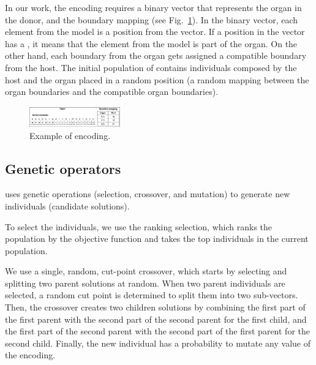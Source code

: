 In our work, the encoding requires a binary vector that represents the organ in the donor, and the boundary mapping (see Fig.~\ref{fig:encoding}). In the binary vector, each element from the model is a position from the vector. If a position in the vector has a , it means that the element from the model is part of the organ. On the other hand, each boundary from the organ gets assigned a compatible boundary from the host.
The initial population of \ApproachName{} contains individuals composed by the host and the organ placed in a random position (a random mapping between the organ boundaries and the compatible organ boundaries).

\begin{figure}[tb]
    \centering
    \includegraphics[width=0.35\textwidth]{Figures/encoding.png}
    \caption{Example of encoding.}
    \label{fig:encoding}
\end{figure}

\subsection{Genetic operators}

\ApproachName{} uses genetic operations (selection, crossover, and mutation) to generate new individuals (\ie candidate solutions). 

To select the individuals, we use the ranking selection, which ranks the population by the objective function and takes the top individuals in the current population.

We use a single, random, cut-point crossover, which starts by selecting and splitting two parent solutions at random. When two parent individuals are selected, a random cut point is determined to split them into two sub-vectors.
Then, the crossover creates two children solutions by combining the first part of the first parent with the second part of the second parent for the first child, and the first part of the second parent with the second part of the first parent for the second child.
Finally, the new individual has a probability to mutate any value of the encoding. 


